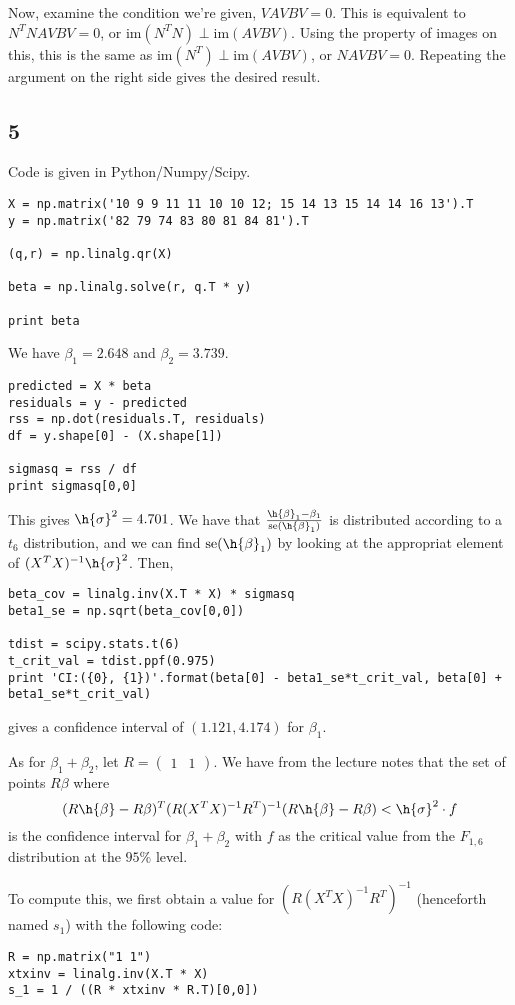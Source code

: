 \documentclass{article}
\newcommand{\openm}{\begin{pmatrix}}
\newcommand{\closem}{\end{pmatrix}}
\begin{document}
Now, examine the condition we're given, $VAVBV=0$. This is equivalent to $N^TNAVBV=0$, or $\text{im}(N^TN)\perp\text{im}(AVBV)$. Using the property of images on this, this is the same as $\text{im}(N^T)\perp\text{im}(AVBV)$, or $NAVBV=0$. Repeating the argument on the right side gives the desired result.

\subsection*{5}
Code is given in Python/Numpy/Scipy. 
\begin{verbatim}
X = np.matrix('10 9 9 11 11 10 10 12; 15 14 13 15 14 14 16 13').T
y = np.matrix('82 79 74 83 80 81 84 81').T

(q,r) = np.linalg.qr(X)

beta = np.linalg.solve(r, q.T * y)

print beta
\end{verbatim}
We have $\beta_1=2.648$ and $\beta_2=3.739$.
\begin{verbatim}
predicted = X * beta
residuals = y - predicted
rss = np.dot(residuals.T, residuals)
df = y.shape[0] - (X.shape[1])

sigmasq = rss / df
print sigmasq[0,0]
\end{verbatim}
This gives $\h{\sigma}^2=4.701$.
We have that $\frac{\h{\beta}_1-\beta_1}{\text{se}(\h{\beta}_1)}$ is distributed according to a $t_6$ distribution, and we can find $\text{se}(\h{\beta}_1)$ by looking at the appropriat element of $(X^TX)^{-1}\h{\sigma}^2$. Then,
\begin{verbatim}
beta_cov = linalg.inv(X.T * X) * sigmasq
beta1_se = np.sqrt(beta_cov[0,0])

tdist = scipy.stats.t(6)
t_crit_val = tdist.ppf(0.975)
print 'CI:({0}, {1})'.format(beta[0] - beta1_se*t_crit_val, beta[0] + beta1_se*t_crit_val)
\end{verbatim}
gives a confidence interval of $(1.121,4.174)$ for $\beta_1$.

As for $\beta_1+\beta_2$, let $R=\openm1&1\closem$. We have from the lecture notes that the set of points $R\beta$ where
\[(R\h{\beta}-R\beta)^T(R(X^TX)^{-1}R^T)^{-1}(R\h{\beta}-R\beta)<\h{\sigma}^2\cdot f\]
is the confidence interval for $\beta_1+\beta_2$ with $f$ as the critical value from the $F_{1,6}$ distribution at the $95\%$ level.

To compute this, we first obtain a value for $(R(X^TX)^{-1}R^T)^{-1}$ (henceforth named $s_1$) with the following code:
\begin{verbatim}
R = np.matrix("1 1")
xtxinv = linalg.inv(X.T * X)
s_1 = 1 / ((R * xtxinv * R.T)[0,0])
\end{verbatim}
\end{document}
